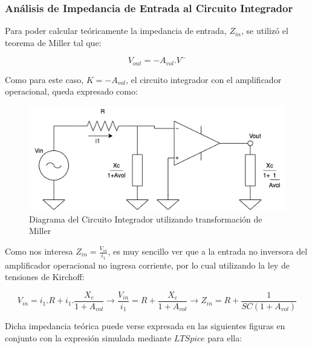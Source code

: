 \subsubsection{Análisis de Impedancia de Entrada al Circuito Integrador}

Para poder calcular teóricamente la impedancia de entrada, $Z_{in}$, se utilizó el teorema de Miller tal que:

$$ V_{out}=-A_{vol}.V^-$$

Como para este caso, $K=-A_{vol}$, el circuito integrador con el amplificador operacional, queda expresado como:

\begin{figure}[H]
    \centering 
    \includegraphics [scale=0.6] {../Ejercicio3-CircuitoIntegradoresyDerivadores/Imagenes/miller-integrador.png} 
    \caption{Diagrama del Circuito Integrador utilizando transformación de Miller }
    \label{fig:emptyPlotTool}
\end{figure}

Como nos interesa $Z_{in}=\frac{V_{in}}{i_1}$, es muy sencillo ver que a la entrada no inversora del amplificador operacional no ingresa corriente,
por lo cual utilizando la ley de tensiones de Kirchoff:

$$ V_{in} = i_1.R + i_1.\frac{X_c}{1+A_{vol}} \longrightarrow \frac{V_{in}}{i_1}= R + \frac{X_c}{1+A_{vol}} \longrightarrow Z_{in}=R+\frac{1}{SC(1+A_{vol})}$$

Dicha impedancia teórica puede verse expresada en las siguientes figuras en conjunto con la expresión simulada mediante $LTSpice$ para ella:

